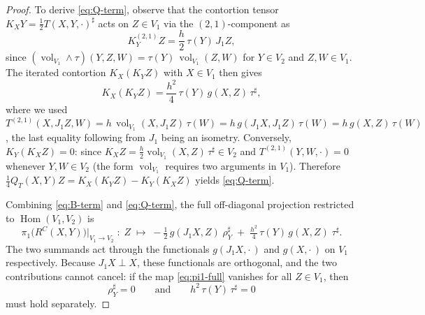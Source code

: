 \documentclass[11pt,reqno]{amsart}
\theoremstyle{plain}
\theoremstyle{definition}
\numberwithin{equation}{section}
\begin{document}
\begin{proof}
To derive \eqref{eq:Q-term}, observe that the contortion tensor $K_XY = \tfrac{1}{2}T(X,Y,\cdot)^\sharp$ acts on $Z \in V_1$ via the $(2,1)$-component as
\[
K_Y^{(2,1)}Z = \frac{h}{2}\,\tau(Y)\,J_1 Z,
\]
since $(\operatorname{vol}_{V_1} \wedge \tau)(Y,Z,W) = \tau(Y)\,\operatorname{vol}_{V_1}(Z,W)$ for $Y \in V_2$ and $Z,W \in V_1$. The iterated contortion $K_X(K_YZ)$ with $X \in V_1$ then gives
\[
K_X(K_YZ) = \frac{h^2}{4}\,\tau(Y)\,g(X,Z)\,\tau^\sharp,
\]
where we used $T^{(2,1)}(X,J_1Z,W) = h\,\operatorname{vol}_{V_1}(X,J_1Z)\,\tau(W) = h\,g(J_1X,J_1Z)\,\tau(W) = h\,g(X,Z)\,\tau(W)$, the last equality following from $J_1$ being an isometry. Conversely, $K_Y(K_XZ) = 0$: since $K_XZ = \tfrac{h}{2}\operatorname{vol}_{V_1}(X,Z)\,\tau^\sharp \in V_2$ and $T^{(2,1)}(Y,W,\cdot) = 0$ whenever $Y,W \in V_2$ (the form $\operatorname{vol}_{V_1}$ requires two arguments in $V_1$). Therefore $\tfrac14 Q_T(X,Y)Z = K_X(K_YZ) - K_Y(K_XZ)$ yields \eqref{eq:Q-term}.


Combining \eqref{eq:B-term}
and \eqref{eq:Q-term}, the full off-diagonal
projection restricted to
$\operatorname{Hom}(V_1,V_2)$ is
\begin{equation}\label{eq:pi1-full}
  \pi_1\bigl(R^C(X,Y)\bigr)\big|_{V_1\to V_2}
  \;:\;
  Z\;\longmapsto\;
  -\tfrac{1}{2}\,g(J_1X,Z)\;\rho_Y^{\sharp}
  \;+\;
  \tfrac{h^2}{4}\,\tau(Y)\,g(X,Z)\;\tau^{\sharp}.
\end{equation}
The two summands act through the functionals
$g(J_1X,\cdot\,)$ and $g(X,\cdot\,)$ on $V_1$
respectively.
Because $J_1X\perp X$, these functionals are
orthogonal, and the two contributions cannot
cancel: if the map \eqref{eq:pi1-full}
vanishes for all $Z\in V_1$, then
\begin{equation}\label{eq:no-cancel}
  \rho_Y^{\sharp}=0
  \qquad\text{and}\qquad
  h^2\,\tau(Y)\,\tau^{\sharp}=0
\end{equation}
must hold separately.


\end{proof}
\end{document}
